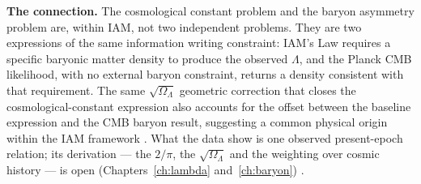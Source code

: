 \textbf{The connection.} The cosmological constant problem and the baryon asymmetry problem are, within IAM, not two independent problems. They are two
expressions of the same information writing constraint: IAM's Law requires a specific baryonic matter density to produce the observed $\Lambda$, and the
Planck CMB likelihood, with no external baryon constraint, returns a density consistent with that requirement. The same $\sqrt{\Omega_\Lambda}$ geometric
correction that closes the cosmological-constant expression also accounts for the offset between the baseline expression and the CMB baryon result,
suggesting a common physical origin within the IAM framework \conjecture. What the data show is one observed present-epoch relation; its derivation --- the
$2/\pi$, the $\sqrt{\Omega_\Lambda}$ and the weighting over cosmic history --- is open (Chapters~\ref{ch:lambda} and~\ref{ch:baryon}) \openprob.

